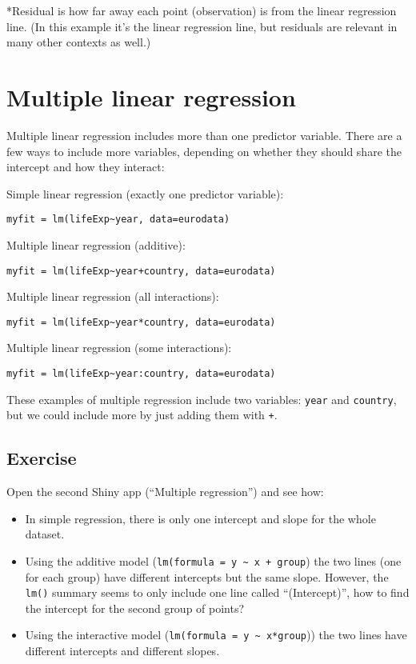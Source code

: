 \documentclass[]{book}
\providecommand{\tightlist}{%
  \setlength{\itemsep}{0pt}\setlength{\parskip}{0pt}}
\theoremstyle{definition}
\theoremstyle{definition}
\theoremstyle{definition}
\theoremstyle{remark}
\begin{document}
*Residual is how far away each point (observation) is from the linear
regression line. (In this example it's the linear regression line, but
residuals are relevant in many other contexts as well.)

\section{Multiple linear regression}\label{multiple-linear-regression}

Multiple linear regression includes more than one predictor variable.
There are a few ways to include more variables, depending on whether
they should share the intercept and how they interact:

Simple linear regression (exactly one predictor variable):

\texttt{myfit\ =\ lm(lifeExp\textasciitilde{}year,\ data=eurodata)}

Multiple linear regression (additive):

\texttt{myfit\ =\ lm(lifeExp\textasciitilde{}year+country,\ data=eurodata)}

Multiple linear regression (all interactions):

\texttt{myfit\ =\ lm(lifeExp\textasciitilde{}year*country,\ data=eurodata)}

Multiple linear regression (some interactions):

\texttt{myfit\ =\ lm(lifeExp\textasciitilde{}year:country,\ data=eurodata)}

These examples of multiple regression include two variables:
\texttt{year} and \texttt{country}, but we could include more by just
adding them with \texttt{+}.

\subsection{Exercise}\label{exercise-38}

Open the second Shiny app (``Multiple regression'') and see how:

\begin{itemize}
\tightlist
\item
  In simple regression, there is only one intercept and slope for the
  whole dataset.
\item
  Using the additive model
  (\texttt{lm(formula\ =\ y\ \textasciitilde{}\ x\ +\ group}) the two
  lines (one for each group) have different intercepts but the same
  slope. However, the \texttt{lm()} summary seems to only include one
  line called ``(Intercept)'', how to find the intercept for the second
  group of points?
\item
  Using the interactive model
  (\texttt{lm(formula\ =\ y\ \textasciitilde{}\ x*group})) the two lines
  have different intercepts and different slopes.
\end{itemize}
\end{document}
